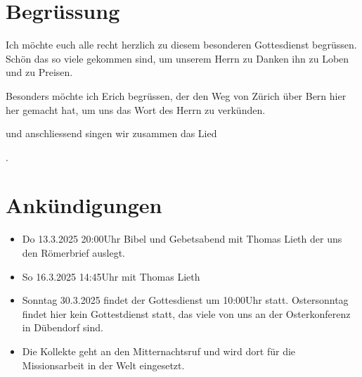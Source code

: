
\section{Begrüssung}

Ich möchte euch alle recht herzlich zu diesem besonderen Gottesdienst begrüssen. Schön das so viele gekommen sind, um unserem Herrn zu Danken ihn zu Loben und zu Preisen.

Besonders möchte ich Erich begrüssen, der den Weg von Zürich über Bern hier her gemacht hat, um uns das Wort des Herrn zu verkünden. 

\noindent
\beten{} und anschliessend singen wir zusammen das Lied

\noindent
{}.

\section{Ankündigungen}
\begin{itemize}
    \item {} Do 13.3.2025 20:00Uhr Bibel und Gebetsabend mit Thomas Lieth der uns den Römerbrief auslegt.
    \item {} So 16.3.2025 14:45Uhr mit Thomas Lieth
    \item {} Sonntag 30.3.2025 findet der Gottesdienst um 10:00Uhr statt. Ostersonntag findet hier kein Gottestdienst statt, das viele von uns an der Osterkonferenz in Dübendorf sind.
    \item {} Die Kollekte geht an den Mitternachtsruf und wird dort für die Missionsarbeit in der Welt eingesetzt.
\end{itemize}

